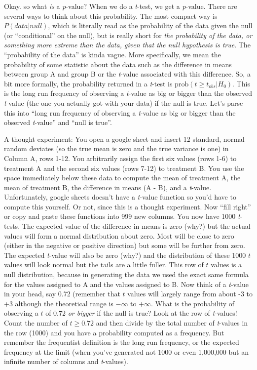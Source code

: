 \documentclass[]{book}
\begin{document}
Okay. so what \emph{is} a \emph{p}-value? When we do a \emph{t}-test, we
get a \emph{p}-value. There are several ways to think about this
probability. The most compact way is \(P(data | null)\), which is
literally read as the probability of the data given the null (or
``conditional'' on the null), but is really short for \emph{the
probability of the data, or something more extreme than the data, given
that the null hypothesis is true}. The ``probability of the data'' is
kinda vague. More specifically, we mean the probability of some
statistic about the data such as the difference in means between group A
and group B or the \emph{t}-value associated with this difference. So, a
bit more formally, the probability returned in a \emph{t}-test is
\(\mathrm{prob}(t \ge t_{obs} | H_0)\). This is the long run frequency
of observing a \emph{t}-value as big or bigger than the observed
\emph{t}-value (the one you actually got with your data) if the null is
true. Let's parse this into ``long run frequency of observing a
\emph{t}-value as big or bigger than the observed \emph{t}-value'' and
``null is true''.

A thought experiment: You open a google sheet and insert 12 standard,
normal random deviates (so the true mean is zero and the true variance
is one) in Column A, rows 1-12. You arbitrarily assign the first six
values (rows 1-6) to treatment A and the second six values (rows 7-12)
to treatment B. You use the space immediately below these data to
compute the mean of treatment A, the mean of treatment B, the difference
in means (A - B), and a \emph{t}-value. Unfortunately, google sheets
doesn't have a \emph{t}-value function so you'd have to compute this
yourself. Or not, since this is a thought experiment. Now ``fill right''
or copy and paste these functions into 999 new columns. You now have
1000 \emph{t}-tests. The expected value of the difference in means is
zero (why?) but the actual values will form a normal distribution about
zero. Most will be close to zero (either in the negative or positive
direction) but some will be further from zero. The expected
\emph{t}-value will also be zero (why?) and the distribution of these
1000 \(t\) values will look normal but the tails are a little fuller.
This row of \(t\) values is a null distribution, because in generating
the data we used the exact same formula for the values assigned to A and
the values assigned to B. Now think of a \emph{t}-value in your head,
say 0.72 (remember that \(t\) values will largely range from about -3 to
+3 although the theoretical range is \(-\infty\) to \(+\infty\). What is
the probability of observing a \(t\) of 0.72 \emph{or bigger} if the
null is true? Look at the row of \emph{t}-values! Count the number of
\(t \ge 0.72\) and then divide by the total number of \emph{t}-values in
the row (1000) and you have a probability computed as a frequency. But
remember the frequentist definition is the long run frequency, or the
expected frequency at the limit (when you've generated not 1000 or even
1,000,000 but an infinite number of columns and \emph{t}-values).
\end{document}
